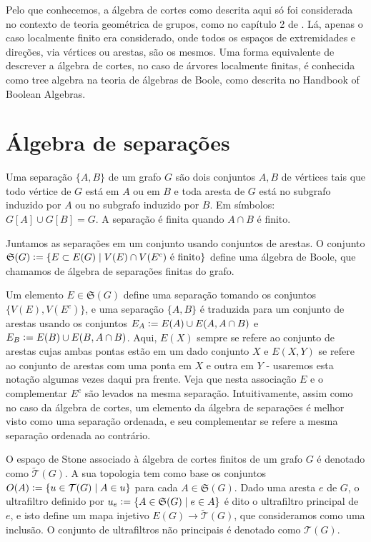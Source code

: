 \documentclass[11pt]{article}
\renewcommand{\textit}[1]{{\fakeitalic#1}}
\newcommand{\defeq}{\vcentcolon=}
\newcommand{\pulinho}{\vspace{.5cm}}
\theoremstyle{definition}
\theoremstyle{definition}
\theoremstyle{definition}
\theoremstyle{definition}
\theoremstyle{definition}
\theoremstyle{definition}
\theoremstyle{definition}
\theoremstyle{definition}
\newtheorem*{definition*}{Definição}
\newenvironment{definicao*}{
\definecolor{shadecolor}{HTML}{defcfc}
\begin{shaded}
\begin{definition*}
}
{
\end{definition*}
\end{shaded}
}
\theoremstyle{definition}
\theoremstyle{definition}
\theoremstyle{definition}
\theoremstyle{definition}
\begin{document}
Pelo que conhecemos, a álgebra de cortes como descrita aqui só foi considerada no contexto de teoria geométrica de grupos, como no capítulo 2 de \cite{Dicks1980}. Lá, apenas o caso localmente finito era considerado, onde todos os espaços de extremidades e direções, via vértices ou arestas, são os mesmos. Uma forma equivalente de descrever a álgebra de cortes, no caso de árvores localmente finitas, é conhecida como \textit{tree algebra} na teoria de álgebras de Boole, como descrita no Handbook of Boolean Algebras. \cite{booleanhandbook}

\section{Álgebra de separações}

\begin{definicao*}
    Uma \textit{separação} $\{A,B\}$ de um grafo $G$ são dois conjuntos $A,B$ de vértices tais que todo vértice de $G$ está em $A$ ou em $B$ e toda aresta de $G$ está no subgrafo induzido por $A$ ou no subgrafo induzido por $B$. Em símbolos: $G[A] \cup G[B] = G$. A separação é finita quando $A \cap B$ é finito.

    \pulinho

    Juntamos as separações em um conjunto usando conjuntos de arestas. O conjunto $\mathfrak{S}(G) \defeq \{ E \subset E(G) \mid V(E) \cap V(E^c) \text{ é finito} \}$ define uma álgebra de Boole, que chamamos de \textit{álgebra de separações finitas} do grafo.

    \pulinho
\end{definicao*}

Um elemento $E \in \mathfrak{S}(G)$ define uma separação tomando os conjuntos $\{V(E), V(E^c)\}$, e uma separação $\{A,B\}$ é traduzida para um conjunto de arestas usando os conjuntos $E_A \defeq E(A) \cup E(A,A\cap B)$ e $E_B \defeq E(B) \cup E(B,A\cap B) $. Aqui, $E(X)$ sempre se refere ao conjunto de arestas cujas ambas pontas estão em um dado conjunto $X$ e $E(X,Y)$ se refere ao conjunto de arestas com uma ponta em $X$ e outra em $Y$ - usaremos esta notação algumas vezes daqui pra frente. Veja que nesta associação $E$ e o complementar $E^c$ são levados na mesma separação. Intuitivamente, assim como no caso da álgebra de cortes, um elemento da álgebra de separações é melhor visto como uma separação ordenada, e seu complementar se refere a mesma separação ordenada ao contrário.

\begin{definicao*}
O espaço de Stone associado à álgebra de cortes finitos de um grafo $G$ é denotado como $\widetilde{\mathcal{T}}(G)$. A sua topologia tem como base os conjuntos $O(A) \defeq \{u \in \mathcal{T}(G) \mid A \in u\}$ para cada $A \in \mathfrak{S}(G)$. Dado uma aresta $e$ de $G$, o ultrafiltro definido por $u_e \defeq \{A \in \mathfrak{S}(G) \mid e \in A\}$ é dito o ultrafiltro principal de $e$, e isto define um mapa injetivo $E(G) \rightarrow \widetilde{\mathcal{T}}(G)$, que consideramos como uma inclusão. O conjunto de ultrafiltros não principais é denotado como $\mathcal{T}(G)$.
    
\end{definicao*}
\end{document}
